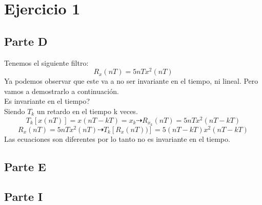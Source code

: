 \documentclass{report}
\begin{document}


\tableofcontents
\newpage

\chapter*{Ejercicio 1}

\section{Parte D}
Tenemos el siguiente filtro:
$$R_x(nT) = 5nTx^2(nT)$$
Ya podemos observar que este va a no ser invariante en el tiempo, ni lineal. Pero vamos a demostrarlo a continuaci\'on.\\
Es invariante en el tiempo?\\
Siendo $T_k$ un retardo en el tiempo k veces.
$$T_k[x(nT)] = x(nT-kT) = x_k\dashrightarrow R_{x_{k}}(nT) = 5nTx^2(nT-kT)$$
$$R_x(nT) = 5nTx^2(nT)\dashrightarrow T_k[R_x(nT))] = 5(nT-kT)x^2(nT-kT)$$
Las ecuaciones son diferentes por lo tanto no es invariante en el tiempo.

\section{Parte E}


\section{Parte I}
\end{document}
